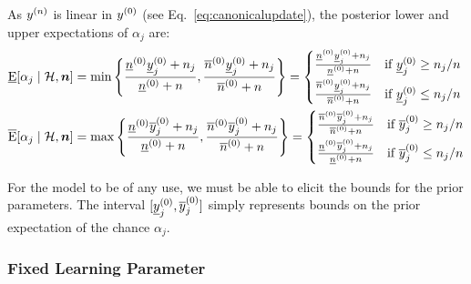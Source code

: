 As $y^{(n)}$ is linear in $y^{(0)}$ (see Eq.~\eqref{eq:canonicalupdate}), the posterior lower and upper expectations of $\alpha_j$ are:
\begin{align}
  \label{eq:idm-update-lower}
  \underline{\operatorname{E}}[\alpha_j\mid\mathcal{H},{\bm n}]
  &=
  \min\left\{
    \frac{\underline{n}^{(0)}\underline{y}^{(0)}_j + n_j}{\underline{n}^{(0)} + n},
    \frac{\overline{n}^{(0)}\underline{y}^{(0)}_j + n_j}{\overline{n}^{(0)} + n}
  \right\}
  =
  \begin{cases}
    \frac{\underline{n}^{(0)}\underline{y}^{(0)}_j + n_j}{\underline{n}^{(0)} + n} & \text{if }\underline{y}^{(0)}_j\ge n_j/n \\[1ex]
    \frac{\overline{n}^{(0)}\underline{y}^{(0)}_j + n_j}{\overline{n}^{(0)} + n} & \text{if }\underline{y}^{(0)}_j\le n_j/n
  \end{cases}
  \\
  \label{eq:idm-update-upper}
  \overline{\operatorname{E}}[\alpha_j\mid\mathcal{H},{\bm n}]
  &=
  \max\left\{
    \frac{\underline{n}^{(0)}\overline{y}^{(0)}_j + n_j}{\underline{n}^{(0)} + n},
    \frac{\overline{n}^{(0)}\overline{y}^{(0)}_j + n_j}{\overline{n}^{(0)} + n}
  \right\}
  =
  \begin{cases}
    \frac{\overline{n}^{(0)}\overline{y}^{(0)}_j + n_j}{\overline{n}^{(0)} + n} & \text{if }\overline{y}^{(0)}_j\ge n_j/n \\[1ex]
    \frac{\underline{n}^{(0)}\overline{y}^{(0)}_j + n_j}{\underline{n}^{(0)} + n} & \text{if }\overline{y}^{(0)}_j\le n_j/n
  \end{cases}
\end{align}

For the model to be of any use, we must be able to elicit the bounds for the prior parameters.
The interval $[\underline{y}^{(0)}_j,\overline{y}^{(0)}_j]$ simply represents bounds on the prior expectation of the chance $\alpha_j$.

\subsubsection{Fixed Learning Parameter}
\label{sec:fixedlearningparameter}

